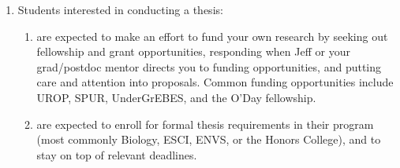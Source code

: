 \documentclass[12pt]{article}
\begin{document}
\begin{enumerate}
\item Students interested in conducting a thesis:
\begin{enumerate}
\item are expected to make an effort to fund your own research by seeking out fellowship and grant opportunities, responding when Jeff or your grad/postdoc mentor directs you to funding opportunities, and putting care and attention into proposals. Common funding opportunities include UROP, SPUR, UnderGrEBES, and the O'Day fellowship. 

\item are expected to enroll for formal thesis requirements in their program (most commonly Biology, ESCI, ENVS, or the Honors College), and to stay on top of relevant deadlines.

\end{enumerate}
\end{enumerate}
\end{document}
